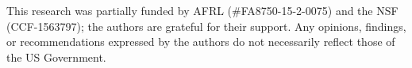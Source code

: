 \documentclass[sigconf]{acmart}
\begin{document}
\begin{acks}
This research was partially funded by AFRL (\#FA8750-15-2-0075) and the NSF (CCF-1563797); the authors are grateful for their support. Any opinions, findings, or recommendations expressed by the authors do not necessarily reflect those of the US Government.

\end{acks}




\end{document}
